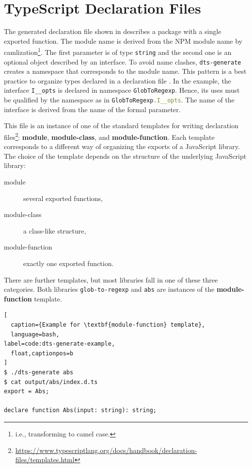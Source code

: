 \documentclass[sigconf]{acmart}
\begin{document}

\section{TypeScript Declaration Files}
\label{sec:typescr-decl-files}

The generated declaration file shown in 
describes a package with a single exported function. The module name
is derived from the NPM module name by camlization\footnote{i.e.,
  transforming to camel case.}. The first parameter is of type
\texttt{string} and the second one is an optional object described by
an interface. To avoid name clashes, \texttt{dts-generate} creates a
namespace that corresponds to the module name. This pattern is a best
practice to  organize types declared in a declaration file
\cite{typescript-namespaces}. In the example, the interface
\lstinline[language=TypeScript]{I__opts} is declared in namespace
\lstinline[language=TypeScript]{GlobToRegexp}. Hence, its uses
must be qualified by the namespace as in
\lstinline[language=TypeScript]{GlobToRegexp.I__opts}. The name of the
interface is derived from the name of the formal parameter. 

This file is an instance of one of the standard templates for writing
declaration
files\footnote{\url{https://www.typescriptlang.org/docs/handbook/declaration-files/templates.html}}:
\textbf{module}, \textbf{module-class}, and
\textbf{module-function}. 
Each template corresponds to a different way of organizing the exports
of a JavaScript library. The choice of the template depends on the
structure of the underlying JavaScript library:
\begin{description}
\item[module] several exported functions,
\item[module-class] a class-like structure,
\item[module-function] exactly one exported function.
\end{description}
There are further templates, but most libraries fall in one of these
three categories.
Both libraries \texttt{glob-to-regexp} and \texttt{abs} are instances of the
\textbf{module-function} template.

\begin{lstlisting}[
  caption={Example for \textbf{module-function} template},
  language=bash,
label=code:dts-generate-example,
  float,captionpos=b
]
$ ./dts-generate abs
$ cat output/abs/index.d.ts 
export = Abs;

declare function Abs(input: string): string;
\end{lstlisting}
\end{document}
